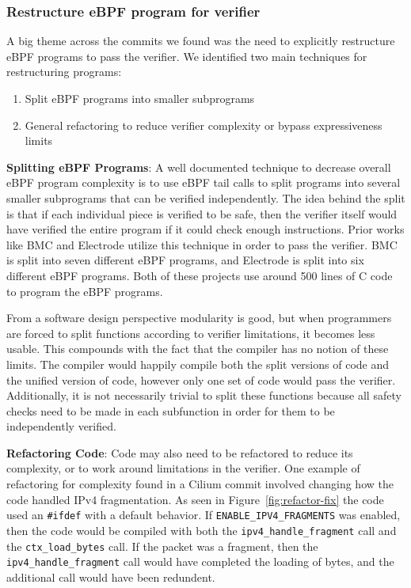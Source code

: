 \subsubsection{Restructure eBPF program for verifier}
A big theme across the commits we found was the need to explicitly restructure eBPF programs to pass the verifier.
We identified two main techniques for restructuring programs:

\begin{enumerate}
    \item Split eBPF programs into smaller subprograms
    \item General refactoring to reduce verifier complexity or bypass expressiveness limits
\end{enumerate}

\noindent\textbf{Splitting eBPF Programs}:
A well documented technique to decrease overall eBPF program complexity is to use eBPF tail calls to split programs into several smaller subprograms that can be verified independently.
The idea behind the split is that if each individual piece is verified to be safe, then the verifier itself would have verified the entire program if it could check enough instructions.
Prior works like BMC\cite{BMC} and Electrode\cite{Electrode} utilize this technique in order to pass the verifier.
BMC is split into seven different eBPF programs, and Electrode is split into six different eBPF programs.
Both of these projects use around 500 lines of C code to program the eBPF programs.

From a software design perspective modularity is good, but when programmers are forced to split functions according to verifier limitations, it becomes less usable.
This compounds with the fact that the compiler has no notion of these limits.
The compiler would happily compile both the split versions of code and the unified version of code, however only one set of code would pass the verifier.
Additionally, it is not necessarily trivial to split these functions because all safety checks need to be made in each subfunction in order for them to be independently verified.

\noindent\textbf{Refactoring Code}:
Code may also need to be refactored to reduce its complexity, or to work around limitations in the verifier.
One example of refactoring for complexity found in a Cilium commit involved changing how the code handled IPv4 fragmentation.
As seen in Figure~\ref{fig:refactor-fix} the code used an \texttt{\#ifdef} with a default behavior.
If \texttt{ENABLE\_IPV4\_FRAGMENTS} was enabled, then the code would be compiled with both the \texttt{ipv4\_handle\_fragment} call and the \texttt{ctx\_load\_bytes} call. 
If the packet was a fragment, then the \texttt{ipv4\_handle\_fragment} call would have completed the loading of bytes, and the additional call would have been redundent.

